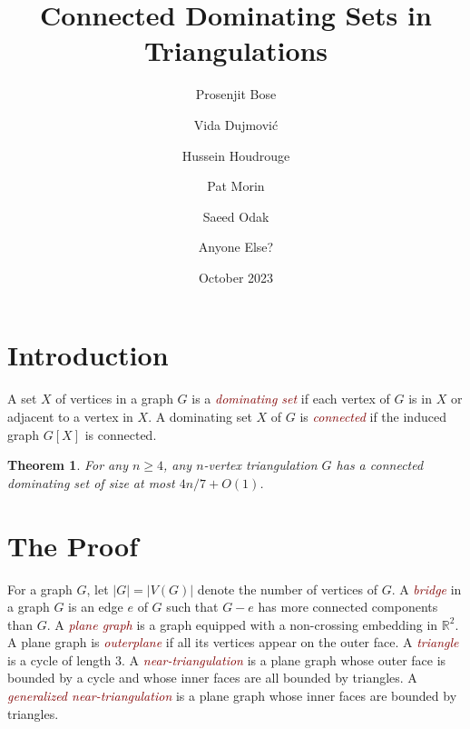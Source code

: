 \documentclass[12pt]{article}
\title{Connected Dominating Sets in Triangulations}
\author{Prosenjit Bose \and Vida Dujmović \and Hussein Houdrouge \and Pat Morin \and Saeed Odak \and Anyone Else?}
\date{October 2023}
\newtheorem{thm}{Theorem}
\newcommand{\defin}[1]{\emph{\textcolor{Maroon}{#1}}}
\newcommand{\pat}[1]{[\textcolor{red}{#1}]}
\begin{document}
\maketitle



\section{Introduction}

A set $X$ of vertices in a graph $G$ is a \defin{dominating set} if each vertex of $G$ is in $X$ or adjacent to a vertex in $X$.  A dominating set $X$ of $G$ is \defin{connected} if the induced graph $G[X]$ is connected.  


\begin{thm}\label{main_result}
  For any $n\ge 4$, any $n$-vertex triangulation $G$ has a connected dominating set of size at most $4n/7 + O(1)$. 
\end{thm}

\section{The Proof}

For a graph $G$, let $|G|=|V(G)|$ denote the number of vertices of $G$.  A \defin{bridge} in a graph $G$ is an edge $e$ of $G$ such that $G-e$ has more connected components than $G$.  A \defin{plane graph} is a graph equipped with a non-crossing embedding in $\mathbb{R}^2$.  A plane graph is \defin{outerplane} if all its vertices appear on the outer face.  A \defin{triangle} is a cycle of length $3$. A \defin{near-triangulation} is a plane graph whose outer face is bounded by a cycle and whose inner faces are all bounded by triangles.  A \defin{generalized near-triangulation} is a plane graph whose inner faces are bounded by triangles.
\end{document}
